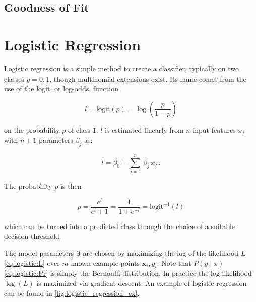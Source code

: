 \subsection{Goodness of Fit}
\label{regression:linear:goodness_of_fit}



\section{Logistic Regression}
\label{regression:logistic}

Logistic regression is a simple method to create a classifier,
typically on two classes $y = 0,1$, though multinomial extensions exist.
Its name comes from the use of the logit, or log-odds, function

\begin{equation}\label{eq:logistic:logic}
l = \text{logit}\left(p\right) = \log\left(\frac{p}{1-p}\right)
\end{equation}

\noindent on the probability $p$ of class $1$.
$l$ is estimated linearly from $n$ input features $x_{j}$ with $n+1$ parameters $\beta_{j}$ as:

\begin{equation}\label{eq:logistic:logicBeta}
l = \beta_{0} + \sum_{j=1}^{n} \, \beta_{j}\,x_{j}\,.
\end{equation}

\noindent The probability $p$ is then

\begin{equation}\label{eq:logistic:p}
p = \frac{e^l}{e^l + 1} = \frac{1}{1+e^{-l}} = \text{logit}^{-1}\left(l\right)
\end{equation}

\noindent which can be turned into a predicted class through the choice of a suitable decision threshold.

The model parameters $\bm{\beta}$ are chosen by maximizing
the log of the likelihood $L$ \cref{eq:logistic:L} over $m$ known example points $\mathbf{x}_{i}, y_{i}$.
Note that $P\left(y \mid x\right)$ \cref{eq:logistic:Pr} is simply the Bernoulli distribution.
In practice the log-likelihood $\log\left(L\right)$ is maximized via gradient descent.
An example of logistic regression can be found in \cref{fig:logistic_regression_ex}.

